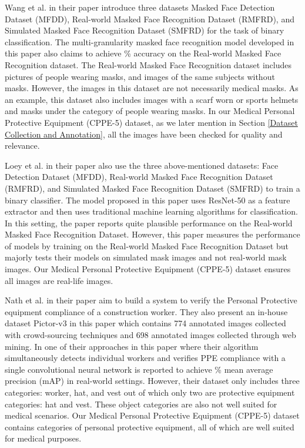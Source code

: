 \documentclass{article}
\begin{document}
Wang et al. \cite{wang2020masked} in their paper introduce three datasets Masked Face Detection Dataset (MFDD), Real-world Masked Face Recognition Dataset (RMFRD), and Simulated Masked Face Recognition Dataset (SMFRD) for the task of binary classification. The multi-granularity masked face recognition model developed in this paper also claims to achieve  \% accuracy on the Real-world Masked Face Recognition dataset. The Real-world Masked Face Recognition dataset includes  pictures of  people wearing masks, and  images of the same  subjects without masks. However, the images in this dataset are not necessarily medical masks. As an example, this dataset also includes images with a scarf worn or sports helmets and masks under the category of people wearing masks. In our Medical Personal Protective Equipment (CPPE-5) dataset, as we later mention in Section \ref{Dataset Collection and Annotation}, all the images have been checked for quality and relevance.

Loey et al. \cite{LOEY2021108288} in their paper also use the three above-mentioned datasets: Face Detection Dataset (MFDD), Real-world Masked Face Recognition Dataset (RMFRD), and Simulated Masked Face Recognition Dataset (SMFRD) to train a binary classifier. The model proposed in this paper uses ResNet-50 \cite{he2016deep} as a feature extractor and then uses traditional machine learning algorithms for classification. In this setting, the paper reports quite plausible performance on the Real-world Masked Face Recognition Dataset. However, this paper measures the performance of models by training on the Real-world Masked Face Recognition Dataset but majorly tests their models on simulated mask images and not real-world mask images. Our Medical Personal Protective Equipment (CPPE-5) dataset ensures all images are real-life images.

Nath et al. \cite{nath2020deep} in their paper aim to build a system to verify the Personal Protective equipment compliance of a construction worker. They also present an in-house dataset Pictor-v3 in this paper which contains 774 annotated images collected with crowd-sourcing techniques and 698 annotated images collected through web mining. In one of their approaches in this paper where their algorithm simultaneously detects individual workers and verifies PPE compliance with a single convolutional neural network is reported to achieve  \% mean average precision (mAP) in real-world settings. However, their dataset only includes three categories: worker, hat, and vest out of which only two are protective equipment categories: hat and vest. These object categories are also not well suited for medical scenarios. Our Medical Personal Protective Equipment (CPPE-5) dataset contains  categories of personal protective equipment, all of which are well suited for medical purposes.
\end{document}
